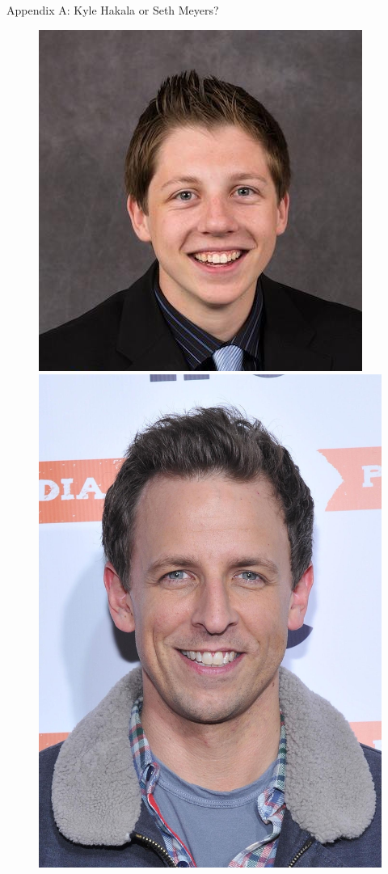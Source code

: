 \documentclass[xcolor=dvipsnames,aspectratio=1610]{beamer}
\begin{document}
  \begin{frame}{Appendix A: Kyle Hakala or Seth Meyers?}

      \begin{figure}
      \centering
      \begin{minipage}{.5\textwidth}
        \centering
        \includegraphics[width=\linewidth]{kyle.png}
      \end{minipage}%
      \begin{minipage}{.5\textwidth}
        \centering
        \includegraphics[width=.8\linewidth]{seth.jpg}

\end{minipage}
\end{figure}
\end{frame}
\end{document}
